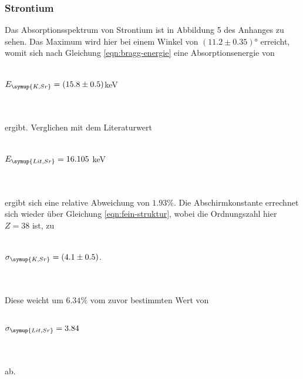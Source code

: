         \subsubsection{Strontium}
            Das Absorptionsspektrum von Strontium ist in Abbildung 5 des Anhanges zu sehen.
            Das Maximum wird hier bei einem Winkel von $(11.2 \pm 0.35)°$ erreicht, womit sich nach 
            Gleichung \eqref{eqn:bragg-energie} eine Absorptionsenergie von 
            \\ \\
            \centerline{$E_{\symup{K, Sr}} = (15.8 \pm 0.5)$keV}  
            \\ \\
            ergibt. Verglichen mit dem Literaturwert
            \\ \\
            \centerline{$E_{\symup{Lit, Sr}} = 16.105$ keV \cite{periodic}}
            \\ \\
            ergibt sich eine relative Abweichung von $1.93 \%$. Die Abschirmkonstante
            errechnet sich wieder über Gleichung \eqref{eqn:fein-struktur}, wobei die
            Ordnungszahl hier $Z = 38$ ist, zu
            \\ \\
            \centerline{$\sigma_{\symup{K, Sr}} = (4.1 \pm 0.5)$.} 
            \\ \\
            Diese weicht um $6.34 \%$ vom zuvor bestimmten Wert von 
            \\ \\
            \centerline{$\sigma_{\symup{Lit, Sr}} = 3.84$}
            \\ \\
            ab.

